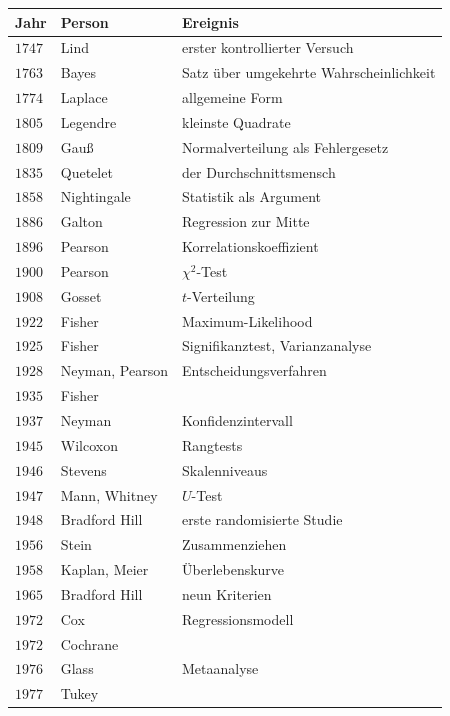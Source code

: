 \begin{merksatz}
\begin{center}
{\small
\renewcommand{\arraystretch}{1.36}
\begin{tabular}{@{}P{1.4cm}P{2.8cm}P{4.0cm}@{}}
\toprule
\textbf{Jahr} & \textbf{Person} & \textbf{Ereignis}\\
\midrule
$1747$ & Lind & erster kontrollierter Versuch\\
$1763$ & Bayes & Satz über umgekehrte Wahrscheinlichkeit\\
$1774$ & Laplace & allgemeine Form\\
$1805$ & Legendre & kleinste Quadrate\\
$1809$ & Gauß & Normalverteilung als Fehlergesetz\\
$1835$ & Quetelet & der Durchschnittsmensch\\
$1858$ & Nightingale & Statistik als Argument\\
$1886$ & Galton & Regression zur Mitte\\
$1896$ & Pearson & Korrelationskoeffizient\\
$1900$ & Pearson & $\chi^2$-Test\\
$1908$ & Gosset & $t$-Verteilung\\
$1922$ & Fisher & Maximum-Likelihood\\
$1925$ & Fisher & Signifikanztest, Varianzanalyse\\
$1928$ & Neyman, Pearson & Entscheidungsverfahren\\
$1935$ & Fisher & \\
$1937$ & Neyman & Konfidenzintervall\\
$1945$ & Wilcoxon & Rangtests\\
$1946$ & Stevens & Skalenniveaus\\
$1947$ & Mann, Whitney & $U$-Test\\
$1948$ & Bradford Hill & erste randomisierte Studie\\
$1956$ & Stein & Zusammenziehen\\
$1958$ & Kaplan, Meier & Überlebenskurve\\
$1965$ & Bradford Hill & neun Kriterien\\
$1972$ & Cox & Regressionsmodell\\
$1972$ & Cochrane & \\
$1976$ & Glass & Metaanalyse\\
$1977$ & Tukey & \\

\end{tabular}}
\end{center}
\end{merksatz}

